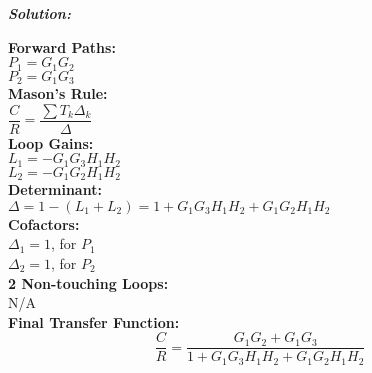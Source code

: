 \documentclass[11pt,letterpaper]{article}
\begin{document}
\vspace{12pt}
\begin{center}

\noindent\textit{\textbf{Solution:}}

\vspace{12pt}


\noindent\textbf{Forward Paths:} \\
\hspace*{1em} \( P_1 = G_1G_2 \) \\
\hspace*{1em} \( P_2 = G_1G_3 \) \\[6pt]

\noindent\textbf{Mason's Rule:} \\
\hspace*{1em} \( \dfrac{C}{R} = \dfrac{\sum T_k \Delta_k}{\Delta} \) \\[6pt]

\noindent\textbf{Loop Gains:} \\
\hspace*{1em} \( L_1 = -G_1G_3H_1H_2 \) \\
\hspace*{1em} \( L_2 = -G_1G_2H_1H_2 \) \\[6pt]

\noindent\textbf{Determinant:} \\
\hspace*{1em} \( \Delta = 1 - (L_1 + L_2) = 1 + G_1G_3H_1H_2 + G_1G_2H_1H_2 \) \\[6pt]

\noindent\textbf{Cofactors:} \\
\hspace*{1em} \( \Delta_1 = 1 \), for \( P_1 \) \\
\hspace*{1em} \( \Delta_2 = 1 \), for \( P_2 \) \\[6pt]

\noindent\textbf{2 Non-touching Loops:} \\
\hspace*{1em} N/A \\[6pt]

\noindent\textbf{Final Transfer Function:}
\[
\boxed{
\dfrac{C}{R} = \dfrac{G_1G_2 + G_1G_3}{1 + G_1G_3H_1H_2 + G_1G_2H_1H_2}
}
\]

\end{center}
\end{document}

